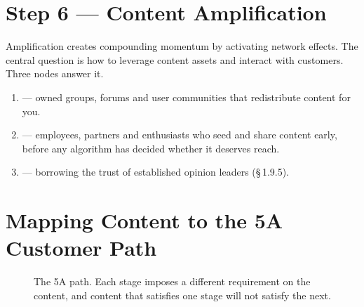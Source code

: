 \documentclass{MMTextbook}
\begin{document}
\section{Step 6 --- Content Amplification}

Amplification creates compounding momentum by activating network effects. The
central question is how to leverage content assets and interact with customers.
Three nodes answer it.

\begin{enumerate}
\item {} --- owned groups, forums and user communities
      that redistribute content for you.
\item {} --- employees, partners and enthusiasts who seed and
      share content early, before any algorithm has decided whether it deserves
      reach.
\item {} --- borrowing the trust of established opinion
      leaders (\S\,1.9.5).
\end{enumerate}

\section{Mapping Content to the 5A Customer Path}

\begin{figure}[htbp]
\centering
{}
\caption[Content requirements along the 5A customer path]%
        {The 5A path. Each stage imposes a different requirement on the content,
         and content that satisfies one stage will not satisfy the next.}
\label{fig:fivea}
\end{figure}
\end{document}
